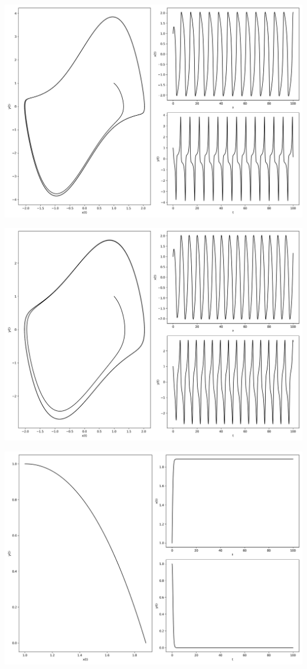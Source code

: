 \documentclass[12pt,a4paper]{jsarticle}
\makeatletter
\def\figcaption{\def\@captype{figure}\caption}
\makeatother
\begin{document}
\figcaption{$x_0=1,00, y_0=1.00, \mu=0.00, \omega=1.00, T = 100, N = 10000$}
\includegraphics[scale=0.33]{x1,0y1,0mu2,0omega1,0t1,00e+02n1,00e+04.png}
\figcaption{$x_0=1,00, y_0=1.00, \mu=2.00, \omega=1.00, T = 100, N = 10000$}
\includegraphics[scale=0.33]{x1,0y1,0mu1,0omega-1,0t1,00e+02n1,00e+04.png}
\figcaption{$x_0=1,00, y_0=1.00, \mu=1.00, \omega=-1.00, T = 100, N = 10000$}
\includegraphics[scale=0.33]{x1,0y1,0mu1,0omega0,0t1,00e+02n1,00e+04.png}
\end{document}
